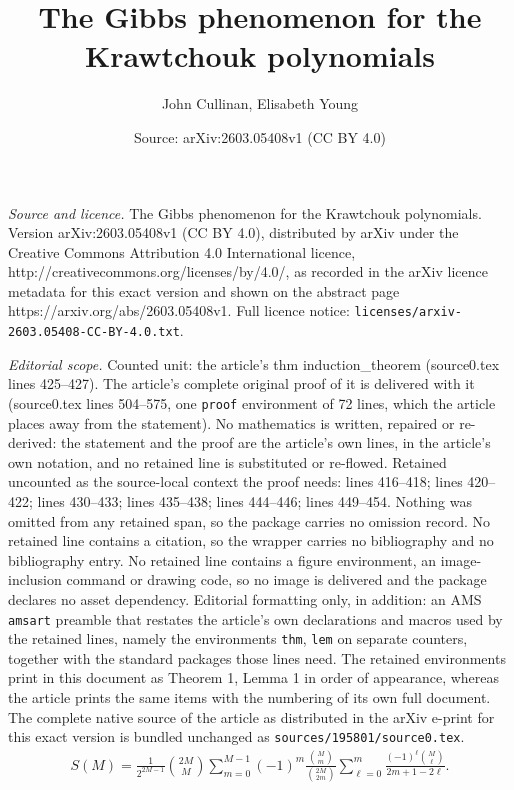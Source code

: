 \documentclass[10pt,a4paper]{amsart}
\title{The Gibbs phenomenon for the Krawtchouk polynomials}
\author{John Cullinan, Elisabeth Young}
\date{Source: arXiv:2603.05408v1 (CC BY 4.0)}
\begin{document}
\maketitle

\noindent\emph{Source and licence.} The Gibbs phenomenon for the Krawtchouk polynomials. Version arXiv:2603.05408v1 (CC BY 4.0), distributed by arXiv under the Creative Commons Attribution 4.0 International licence, http://creativecommons.org/licenses/by/4.0/, as recorded in the arXiv licence metadata for this exact version and shown on the abstract page https://arxiv.org/abs/2603.05408v1. Full licence notice: \texttt{licenses/arxiv-2603.05408-CC-BY-4.0.txt}.\par\smallskip

\noindent\textit{Editorial scope.} Counted unit: the article's thm induction\_theorem (source0.tex lines 425--427). The article's complete original proof of it is delivered with it (source0.tex lines 504--575, one \texttt{proof} environment of 72 lines, which the article places away from the statement). No mathematics is written, repaired or re-derived: the statement and the proof are the article's own lines, in the article's own notation, and no retained line is substituted or re-flowed.  Retained uncounted as the source-local context the proof needs: lines 416--418; lines 420--422; lines 430--433; lines 435--438; lines 444--446; lines 449--454.  Nothing was omitted from any retained span, so the package carries no omission record.  No retained line contains a citation, so the wrapper carries no bibliography and no bibliography entry.  No retained line contains a figure environment, an image-inclusion command or drawing code, so no image is delivered and the package declares no asset dependency.  Editorial formatting only, in addition: an AMS \texttt{amsart} preamble that restates the article's own declarations and macros used by the retained lines, namely the environments \texttt{thm}, \texttt{lem} on separate counters, together with the standard packages those lines need.  The retained environments print in this document as Theorem 1, Lemma 1 in order of appearance, whereas the article prints the same items with the numbering of its own full document.  The complete native source of the article as distributed in the arXiv e-print for this exact version is bundled unchanged as \texttt{sources/195801/source0.tex}.
\begin{align} \label{S(M)_definition}
S(M) = \frac{1}{2^{2M-1}}\binom{2M}{M} \sum_{m=0}^{M-1} (-1)^m \frac{\binom{M}{m}}{\binom{2M}{2m}} \sum_{\ell = 0}^{m} \frac{(-1)^{\ell}\binom{M}{\ell}}{2m+1-2\ell}.
\end{align}
\end{document}
